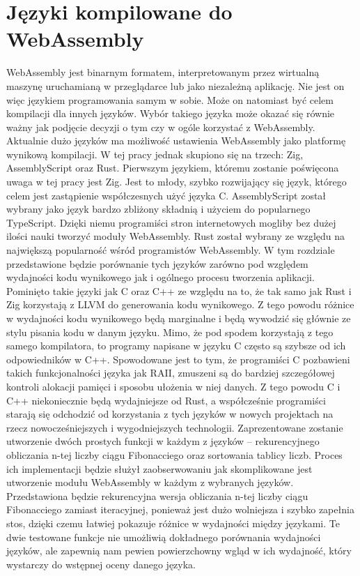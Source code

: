 \documentclass[language=polish,type=master]{aghmodern}
\begin{document}
\chapter{Języki kompilowane do WebAssembly}
WebAssembly jest binarnym formatem, interpretowanym przez wirtualną maszynę uruchamianą w przeglądarce lub jako niezależną aplikację.
Nie jest on więc językiem programowania samym w sobie.
Może on natomiast być celem kompilacji dla innych języków.
Wybór takiego języka może okazać się równie ważny jak podjęcie decyzji o tym czy w ogóle korzystać z WebAssembly.
Aktualnie dużo języków ma możliwość ustawienia WebAssembly jako platformę wynikową kompilacji.
W tej pracy jednak skupiono się na trzech: Zig, AssemblyScript oraz Rust.
Pierwszym językiem, któremu zostanie poświęcona uwaga w tej pracy jest Zig.
Jest to młody, szybko rozwijający się język, którego celem jest zastąpienie współczesnych użyć języka C.
AssemblyScript został wybrany jako język bardzo zbliżony składnią i użyciem do popularnego TypeScript.
Dzięki niemu programiści stron internetowych mogliby bez dużej ilości nauki tworzyć moduły WebAssembly.
Rust został wybrany ze względu na największą popularność wśród programistów WebAssembly.
W tym rozdziale przedstawione będzie porównanie tych języków zarówno pod względem wydajności kodu wynikowego jak i ogólnego procesu tworzenia aplikacji.
Pominięto takie języki jak C oraz C++ ze względu na to, że tak samo jak Rust i Zig korzystają z LLVM\footnotemark{} do generowania kodu wynikowego.
Z tego powodu różnice w wydajności kodu wynikowego będą marginalne i będą wywodzić się głównie ze stylu pisania kodu w danym języku.
Mimo, że pod spodem korzystają z tego samego kompilatora, to programy napisane w języku C często są szybsze od ich odpowiedników w C++.
Spowodowane jest to tym, że programiści C pozbawieni takich funkcjonalności języka jak RAII\footnotemark{}, zmuszeni są do bardziej szczegółowej kontroli alokacji pamięci i sposobu ułożenia w niej danych.
Z tego powodu C i C++ niekoniecznie będą wydajniejsze od Rust, a współcześnie programiści starają się odchodzić od korzystania z tych języków w nowych projektach na rzecz nowocześniejszych i wygodniejszych technologii.
Zaprezentowane zostanie utworzenie dwóch prostych funkcji w każdym z języków -- rekurencyjnego obliczania n-tej liczby ciągu Fibonacciego oraz sortowania tablicy liczb.
Proces ich implementacji będzie służył zaobserwowaniu jak skomplikowane jest utworzenie modułu WebAssembly w każdym z wybranych języków.
Przedstawiona będzie rekurencyjna wersja obliczania n-tej liczby ciągu Fibonacciego zamiast iteracyjnej, ponieważ jest dużo wolniejsza i szybko zapełnia stos, dzięki czemu łatwiej pokazuje różnice w wydajności między językami.
Te dwie testowane funkcje nie umożliwią dokładnego porównania wydajności języków, ale zapewnią nam pewien powierzchowny wgląd w ich wydajność, który wystarczy do wstępnej oceny danego języka.
\end{document}
